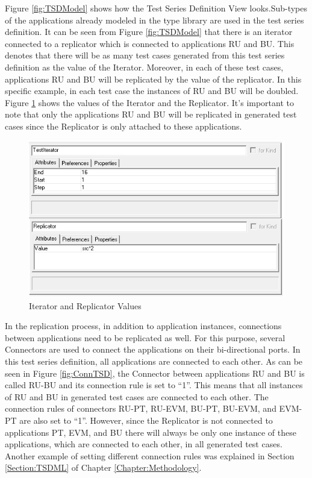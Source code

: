 Figure \ref{fig:TSDModel} shows how the Test Series Definition View looks.Sub-types of the applications already modeled in the type library are used in the test series definition. It can be seen from Figure \ref{fig:TSDModel} that there is an iterator connected to a replicator which is connected to applications RU and BU. This denotes that there will be as many test cases generated from this test series definition as the value of the Iterator. Moreover, in each of these test cases, applications RU and BU will be replicated by the value of the replicator. In this specific example, in each test case the instances of RU and BU will be doubled. Figure \ref{fig:TSDItRep} shows the values of the Iterator and the Replicator. It's important to note that only the applications RU and BU will be replicated in generated test cases since the Replicator is only attached to these applications. 

\begin{figure}
	\centering
		\includegraphics[width=1.00\textwidth]{figures/TSDItRep.png}
	\caption{Iterator and Replicator Values}
	\label{fig:TSDItRep}
\end{figure}

In the replication process, in addition to application instances, connections between applications need to be replicated as well. For this purpose, several Connectors are used to connect the applications on their bi-directional ports. In this test series definition, all applications are connected to each other. As can be seen in Figure \ref{fig:ConnTSD}, the Connector between applications RU and BU is called RU-BU and its connection rule is set to "`1"'. This means that all instances of RU and BU in generated test cases are connected to each other. The connection rules of connectors RU-PT, RU-EVM, BU-PT, BU-EVM, and EVM-PT are also set to "`1"'. However, since the Replicator is not connected to applications PT, EVM, and BU there will always be only one instance of these applications, which are connected to each other, in all generated test cases. Another example of setting different connection rules was explained in Section \ref{Section:TSDML} of Chapter \ref{Chapter:Methodology}. 

